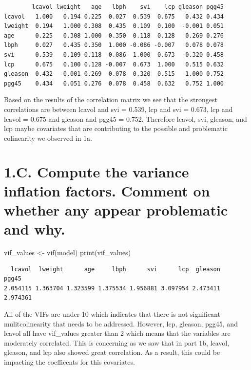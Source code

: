\documentclass[
  letterpaper,
  DIV=11,
  numbers=noendperiod]{scrartcl}
\newenvironment{Shaded}{\begin{snugshade}}{\end{snugshade}}
\newcommand{\FunctionTok}[1]{\textcolor[rgb]{0.28,0.35,0.67}{#1}}
\newcommand{\NormalTok}[1]{\textcolor[rgb]{0.00,0.23,0.31}{#1}}
\newcommand{\OtherTok}[1]{\textcolor[rgb]{0.00,0.23,0.31}{#1}}
\begin{document}
\begin{verbatim}
        lcavol lweight   age   lbph    svi    lcp gleason pgg45
lcavol   1.000   0.194 0.225  0.027  0.539  0.675   0.432 0.434
lweight  0.194   1.000 0.308  0.435  0.109  0.100  -0.001 0.051
age      0.225   0.308 1.000  0.350  0.118  0.128   0.269 0.276
lbph     0.027   0.435 0.350  1.000 -0.086 -0.007   0.078 0.078
svi      0.539   0.109 0.118 -0.086  1.000  0.673   0.320 0.458
lcp      0.675   0.100 0.128 -0.007  0.673  1.000   0.515 0.632
gleason  0.432  -0.001 0.269  0.078  0.320  0.515   1.000 0.752
pgg45    0.434   0.051 0.276  0.078  0.458  0.632   0.752 1.000
\end{verbatim}

Based on the results of the correlation matrix we see that the strongest
correlations are between lcavol and svi = 0.539, lcp and svi = 0.673,
lcp and lcavol = 0.675 and gleason and pgg45 = 0.752. Therefore lcavol,
svi, gleason, and lcp maybe covariates that are contributing to the
possible and problematic colinearity we observed in 1a.

\hypertarget{c.-compute-the-variance-inflation-factors.-comment-on-whether-any-appear-problematic-and-why.}{%
\section{1.C. Compute the variance inflation factors. Comment on whether
any appear problematic and
why.}\label{c.-compute-the-variance-inflation-factors.-comment-on-whether-any-appear-problematic-and-why.}}

\begin{Shaded}
\begin{Highlighting}[]
\NormalTok{vif\_values }\OtherTok{\textless{}{-}} \FunctionTok{vif}\NormalTok{(model)}
\FunctionTok{print}\NormalTok{(vif\_values)}
\end{Highlighting}
\end{Shaded}

\begin{verbatim}
  lcavol  lweight      age     lbph      svi      lcp  gleason    pgg45 
2.054115 1.363704 1.323599 1.375534 1.956881 3.097954 2.473411 2.974361 
\end{verbatim}

All of the VIFs are under 10 which indicates that there is not
significant mulitcolinearity that needs to be addressed. However, lcp,
gleason, pgg45, and lcavol all have vif\_values greater than 2 which
means that the variables are moderately correlated. This is concerning
as we saw that in part 1b, lcavol, gleason, and lcp also showed great
correlation. As a result, this could be impacting the coefficents for
this covariates.
\end{document}
